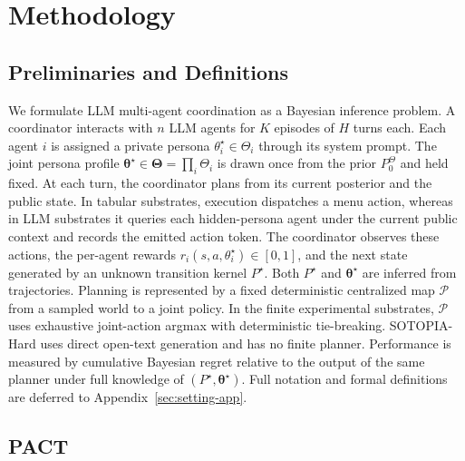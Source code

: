 \documentclass[letterpaper]{article} %
\begin{document}
\section{Methodology}
\label{sec:algorithm}

\subsection{Preliminaries and Definitions}
\label{sec:setting-main}

We formulate LLM multi-agent coordination as a Bayesian inference problem. A coordinator interacts with $n$ LLM agents for $K$ episodes of $H$ turns each. Each agent $i$ is assigned a private persona $\theta_i^\star \in \Theta_i$ through its system prompt. The joint persona profile $\boldsymbol\theta^\star \in \boldsymbol\Theta = \prod_i \Theta_i$ is drawn once from the prior $P_0^\Theta$ and held fixed. At each turn, the coordinator plans from its current posterior and the public state. In tabular substrates, execution dispatches a menu action, whereas in LLM substrates it queries each hidden-persona agent under the current public context and records the emitted action token. The coordinator observes these actions, the per-agent rewards $r_i(s,a,\theta_i^\star)\in[0,1]$, and the next state generated by an unknown transition kernel $P^\star$. Both $P^\star$ and $\boldsymbol\theta^\star$ are inferred from trajectories. Planning is represented by a fixed deterministic centralized map $\mathcal P$ from a sampled world to a joint policy. In the finite experimental substrates, $\mathcal P$ uses exhaustive joint-action argmax with deterministic tie-breaking. SOTOPIA-Hard uses direct open-text generation and has no finite planner. Performance is measured by cumulative Bayesian regret relative to the output of the same planner under full knowledge of $(P^\star, \boldsymbol\theta^\star)$. Full notation and formal definitions are deferred to Appendix~\ref{sec:setting-app}.

\subsection{PACT}
\label{sec:pact-vanilla}
\end{document}
